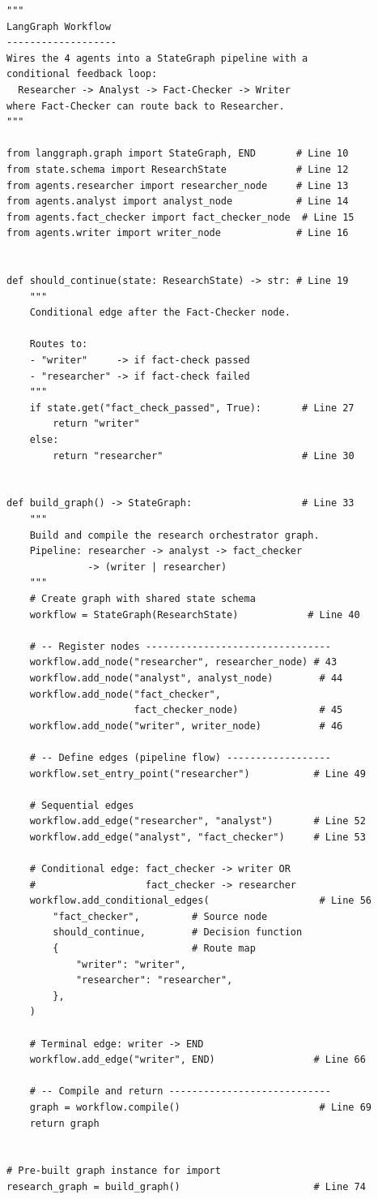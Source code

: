 \documentclass[12pt, a4paper]{article}
\begin{document}
\begin{lstlisting}[style=pythonstyle, title={\color{accentgreen}\faIcon{file} graph/workflow.py --- Full Code (78 lines)}]
"""
LangGraph Workflow
-------------------
Wires the 4 agents into a StateGraph pipeline with a
conditional feedback loop:
  Researcher -> Analyst -> Fact-Checker -> Writer
where Fact-Checker can route back to Researcher.
"""

from langgraph.graph import StateGraph, END       # Line 10
from state.schema import ResearchState            # Line 12
from agents.researcher import researcher_node     # Line 13
from agents.analyst import analyst_node           # Line 14
from agents.fact_checker import fact_checker_node  # Line 15
from agents.writer import writer_node             # Line 16


def should_continue(state: ResearchState) -> str: # Line 19
    """
    Conditional edge after the Fact-Checker node.

    Routes to:
    - "writer"     -> if fact-check passed
    - "researcher" -> if fact-check failed
    """
    if state.get("fact_check_passed", True):       # Line 27
        return "writer"
    else:
        return "researcher"                        # Line 30


def build_graph() -> StateGraph:                   # Line 33
    """
    Build and compile the research orchestrator graph.
    Pipeline: researcher -> analyst -> fact_checker
              -> (writer | researcher)
    """
    # Create graph with shared state schema
    workflow = StateGraph(ResearchState)            # Line 40

    # -- Register nodes --------------------------------
    workflow.add_node("researcher", researcher_node) # 43
    workflow.add_node("analyst", analyst_node)        # 44
    workflow.add_node("fact_checker",
                      fact_checker_node)              # 45
    workflow.add_node("writer", writer_node)          # 46

    # -- Define edges (pipeline flow) ------------------
    workflow.set_entry_point("researcher")           # Line 49

    # Sequential edges
    workflow.add_edge("researcher", "analyst")       # Line 52
    workflow.add_edge("analyst", "fact_checker")     # Line 53

    # Conditional edge: fact_checker -> writer OR
    #                   fact_checker -> researcher
    workflow.add_conditional_edges(                   # Line 56
        "fact_checker",         # Source node
        should_continue,        # Decision function
        {                       # Route map
            "writer": "writer",
            "researcher": "researcher",
        },
    )

    # Terminal edge: writer -> END
    workflow.add_edge("writer", END)                 # Line 66

    # -- Compile and return ----------------------------
    graph = workflow.compile()                        # Line 69
    return graph


# Pre-built graph instance for import
research_graph = build_graph()                       # Line 74
\end{lstlisting}
\end{document}
